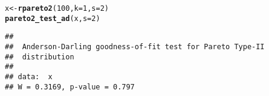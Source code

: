 \documentclass[11pt]{article}\usepackage[]{graphicx}\usepackage[]{color}
\makeatletter
\newcommand{\hlnum}[1]{\textcolor[rgb]{0.686,0.059,0.569}{#1}}%
\newcommand{\hlstd}[1]{\textcolor[rgb]{0.345,0.345,0.345}{#1}}%
\newcommand{\hlkwb}[1]{\textcolor[rgb]{0.69,0.353,0.396}{#1}}%
\newcommand{\hlkwc}[1]{\textcolor[rgb]{0.333,0.667,0.333}{#1}}%
\newcommand{\hlkwd}[1]{\textcolor[rgb]{0.737,0.353,0.396}{\textbf{#1}}}%
\newenvironment{kframe}{%
 \def\at@end@of@kframe{}%
 \ifinner\ifhmode%
  \def\at@end@of@kframe{\end{minipage}}%
  \begin{minipage}{\columnwidth}%
 \fi\fi%
 \def\FrameCommand##1{\hskip\@totalleftmargin \hskip-\fboxsep
 \colorbox{shadecolor}{##1}\hskip-\fboxsep
     \hskip-\linewidth \hskip-\@totalleftmargin \hskip\columnwidth}%
 \MakeFramed {\advance\hsize-\width
   \@totalleftmargin\z@ \linewidth\hsize
   \@setminipage}}%
 {\par\unskip\endMakeFramed%
 \at@end@of@kframe}
\newenvironment{knitrout}{}{} %
\newcommand{\Rfunc}[1]{\texttt{\hlkwd{#1}}}
\theoremstyle{remark}
\theoremstyle{definition}
\makeatother
\begin{document}
\begin{knitrout}\small
{}\color{fgcolor}\begin{kframe}
\begin{alltt}
\hlstd{x} \hlkwb{<-} \hlkwd{rpareto2}\hlstd{(}\hlnum{100}\hlstd{,} \hlkwc{k}\hlstd{=}\hlnum{1}\hlstd{,} \hlkwc{s}\hlstd{=}\hlnum{2}\hlstd{)}
\hlkwd{pareto2_test_ad}\hlstd{(x,} \hlkwc{s}\hlstd{=}\hlnum{2}\hlstd{)}
\end{alltt}
\begin{verbatim}
## 
## 	Anderson-Darling goodness-of-fit test for Pareto Type-II
## 	distribution
## 
## data:  x
## W = 0.3169, p-value = 0.797
\end{verbatim}
\end{kframe}
\end{knitrout}


%
%
%
%



\end{document}
